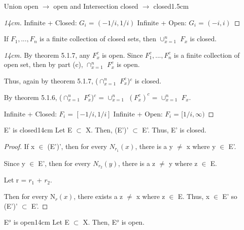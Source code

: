 \begin{ltheorem}{Union open $\rightarrow$ open and
	Intersection closed $\rightarrow$ closed}{1.5cm}
\begin{proof}[14cm]
				\vspace{0.1cm}

				{\color{purple} Infinite + Closed}: $G_i$ = $(-1/i,1/i)$
				\hfill
				{\color{purple} Infinite + Open}: $G_i$ = $(-i,i)$
			\end{proof}

		\item If $F_1, ... , F_n$ is a finite collection of closed sets,
		then $\cup_{x=1}^n$ $F_x$ is closed.

			\begin{proof}[14cm]
				By {\color{red} theorem 5.1.7}, any $F_x^c$ is open.
				Since $F_1^c, ... , F_n^c$ is a finite collection of
				open set, then by part (c), $\cap_{x=1}^n$ $F_x^c$ is open.

				Thus, again by {\color{red} theorem 5.1.7},
				($\cap_{x=1}^n$ $F_x^c$)$^c$ is closed.

				By {\color{red} theorem 5.1.6},
				($\cap_{x=1}^n$ $F_x^c$)$^c$ = $\cup_{x=1}^n$ $(F_x^c)^c$
				= $\cup_{x=1}^n$ $F_x$.

				\vspace{0.1cm}

				{\color{purple} Infinite + Closed}: $F_i$ = $[-1/i,1/i]$
				\hfill
				{\color{purple} Infinite + Open}: $F_i$ = $[1/i,\infty)$
			\end{proof}	 
	\end{ltheorem}

	\newpage



	\begin{wtheorem}{E' is closed}{14cm}
		Let  E $\subset$ X. Then, (E')' $\subset$ E'.
		Thus, E' is closed.
	\end{wtheorem}
	
	\begin{proof}
		If x $\in$ (E')', then for every $N_{r_1}(x)$, there is a
		y $\not =$ x where y $\in$ E'.
		
		Since y $\in$ E', then for every $N_{r_2}(y)$, there is a
		z $\not =$ y where z $\in$ E.

		Let r = $r_1$ + $r_2$.

		Then for every N$_r(x)$, there exists a z $\not =$ x where
		z $\in$ E.
		Thus, x $\in$ E' so (E')' $\subset$ E'.
	\end{proof}

	\vspace{0.5cm}



	\begin{wtheorem}{E$^o$ is open}{14cm}
		Let  E $\subset$ X. Then, E$^o$ is open. 
	\end{wtheorem}
	
